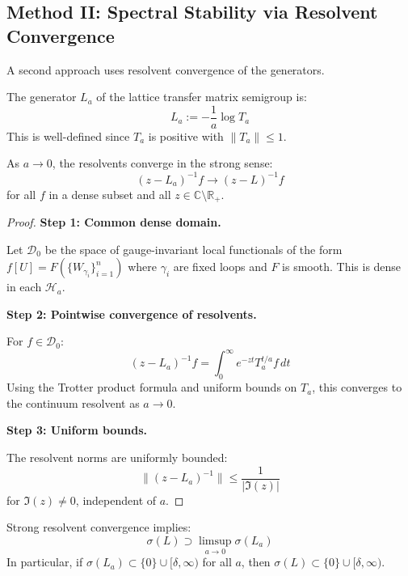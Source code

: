 \subsection{Method II: Spectral Stability via Resolvent Convergence}

A second approach uses resolvent convergence of the generators.

\begin{definition}
The generator $L_a$ of the lattice transfer matrix semigroup is:
\[
L_a := -\frac{1}{a} \log T_a
\]
This is well-defined since $T_a$ is positive with $\|T_a\| \leq 1$.
\end{definition}

\begin{theorem}
\label{thm:resolvent-convergence}
As $a \to 0$, the resolvents converge in the strong sense:
\[
(z - L_a)^{-1} f \to (z - L)^{-1} f
\]
for all $f$ in a dense subset and all $z \in \mathbb{C} \setminus \mathbb{R}_+$.
\end{theorem}

\begin{proof}
\textbf{Step 1: Common dense domain.}

Let $\mathcal{D}_0$ be the space of gauge-invariant local functionals of the 
form $f[U] = F(\{W_{\gamma_i}\}_{i=1}^n)$ where $\gamma_i$ are fixed loops 
and $F$ is smooth. This is dense in each $\mathcal{H}_a$.

\textbf{Step 2: Pointwise convergence of resolvents.}

For $f \in \mathcal{D}_0$:
\[
(z - L_a)^{-1} f = \int_0^\infty e^{-zt} T_a^{t/a} f \, dt
\]
Using the Trotter product formula and uniform bounds on $T_a$, this converges 
to the continuum resolvent as $a \to 0$.

\textbf{Step 3: Uniform bounds.}

The resolvent norms are uniformly bounded:
\[
\|(z - L_a)^{-1}\| \leq \frac{1}{|\Im(z)|}
\]
for $\Im(z) \neq 0$, independent of $a$.
\end{proof}

\begin{corollary}
\label{cor:spectral-resolvent}
Strong resolvent convergence implies:
\[
\sigma(L) \supset \limsup_{a \to 0} \sigma(L_a)
\]
In particular, if $\sigma(L_a) \subset \{0\} \cup [\delta, \infty)$ for all $a$, 
then $\sigma(L) \subset \{0\} \cup [\delta, \infty)$.
\end{corollary}

